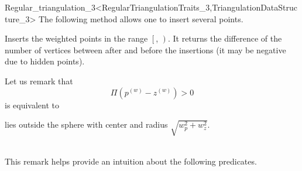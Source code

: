 \begin{ccRefClass}{Regular_triangulation_3<RegularTriangulationTraits_3,TriangulationDataStructure_3>}
The following method allows one to insert several points.

{Inserts the weighted points in the range $\left[\right.$,
$\left.\right)$. 
It returns the difference of the number of vertices between after and
before the insertions (it may be negative due to hidden points).
}


Let us remark that 
\[\Pi({p}^{(w)}-{z}^{(w)}) > 0\]
is equivalent to\\
\centerline{ lies outside the sphere with center  and radius
$\sqrt{w_p^2+w_z^2}$.}\\
This remark helps provide an intuition about the following predicates.


\end{ccRefClass}
